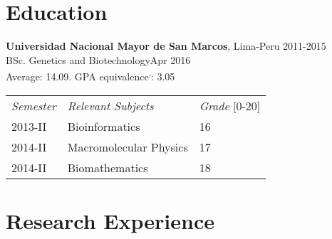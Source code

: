 \documentclass[margin,line]{res}
\begin{document}
\begin{resume}
\section{\sc Education}
{\bf Universidad Nacional Mayor de San Marcos}, Lima-Peru \hfill 2011-2015\\%
BSc. Genetics and Biotechnology\hfill Apr 2016\\
Average: 14.09. GPA equivalence\footnotemark\textsuperscript{,}\footnotemark: 3.05\\%

\begin{center}
	\vspace{-9mm}
	\begin{tabular}{lll}
		\textit{Semester} & \textit{Relevant Subjects} & \textit{Grade} [0-20] \\
		2013-II & Bioinformatics & 16\\
		2014-II & Macromolecular Physics & 17\\
		2014-II & Biomathematics & 18\\
	\end{tabular}
	\vspace{1.8mm}
\end{center}


\section{\sc Research Experience}


\end{resume}
\end{document}
